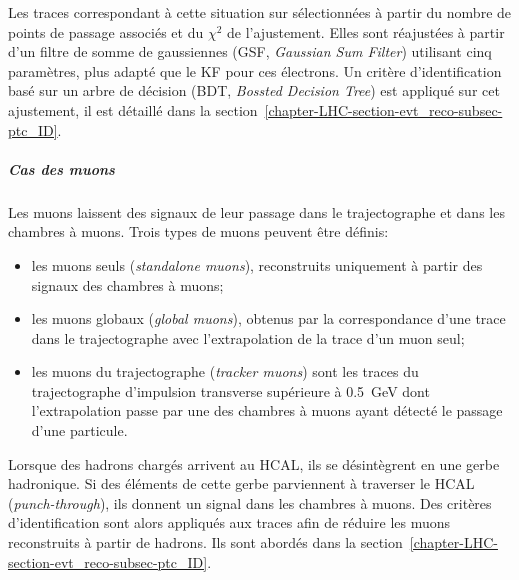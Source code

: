Les traces correspondant à cette situation sur sélectionnées à partir du nombre de points de passage associés et du $\chi^2$ de l'ajustement.
Elles sont réajustées à partir d'un filtre de somme de gaussiennes (GSF, \emph{Gaussian Sum Filter}) \cite{GSF} utilisant cinq paramètres, plus adapté que le KF pour ces électrons.
Un critère d'identification basé sur un arbre de décision (BDT, \emph{Bossted Decision Tree}) est appliqué sur cet ajustement, il est détaillé dans la section~\ref{chapter-LHC-section-evt_reco-subsec-ptc_ID}.
\subparagraph{Cas des muons}
Les muons laissent des signaux de leur passage dans le trajectographe et dans les chambres à muons.
Trois types de muons peuvent être définis:
\begin{itemize}
\item les muons seuls (\emph{standalone muons}), reconstruits uniquement à partir des signaux des chambres à muons;
\item les muons globaux (\emph{global muons}), obtenus par la correspondance d'une trace dans le trajectographe avec l'extrapolation de la trace d'un muon seul;
\item les muons du trajectographe (\emph{tracker muons}) sont les traces du trajectographe d'impulsion transverse supérieure à \SI{0.5}{\GeV} dont l'extrapolation passe par une des chambres à muons ayant détecté le passage d'une particule.
\end{itemize}
\par
Lorsque des hadrons chargés arrivent au HCAL, ils se désintègrent en une gerbe hadronique.
Si des éléments de cette gerbe parviennent à traverser le HCAL (\emph{punch-through}), ils donnent un signal dans les chambres à muons.
Des critères d'identification sont alors appliqués aux traces afin de réduire les muons reconstruits à partir de hadrons.
Ils sont abordés dans la section~\ref{chapter-LHC-section-evt_reco-subsec-ptc_ID}.
